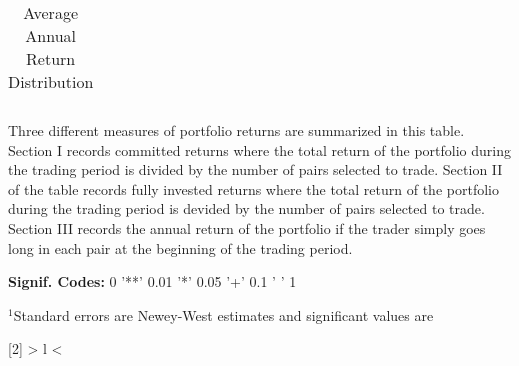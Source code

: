 \documentclass[12pt]{article}
\begin{document}
\begin{table}[hp]
\begin{tabular}{l r r l r r r r r r}
        \vspace{-1mm} \\
        \hline
    \end{tabular}
    \caption{Average Annual Return Distribution}
    \begin{tablenotes}
        \item{\footnotesize Three different measures of portfolio returns are summarized in this table. Section I records committed returns where the total return of the portfolio during the trading period is divided by the number of pairs selected to trade. Section II of the table records fully invested returns where the total return of the portfolio during the trading period is devided by the number of pairs selected to trade. Section III records the annual return of the portfolio if the trader simply goes long in each pair at the beginning of the trading period.}
        \item{\footnotesize \textbf{Signif. Codes:} 0 '**' 0.01 '*' 0.05 '+' 0.1 ' ' 1}
        \item{\footnotesize $^{1}$Standard errors are Newey-West estimates and significant values are } 
    \end{tablenotes}
\end{table}


\newcolumntype{R}[2]{%
    >{\bgroup}%
    l%
    <{\egroup}%
}
\newcommand*\rot{\multicolumn{1}{R{30}{1em}}}%
\end{document}
